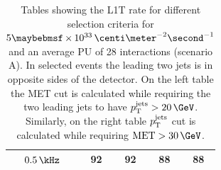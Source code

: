 \begin{table}[!htb]
\begin{minipage}{.5\linewidth}
\begin{tabular}{|c||c|c|c|c|}
  $0.5\,\kHz$  &     92 &  92 &  88 &  88 \\
  \hline
  \end{tabular}
\end{minipage} 
\caption{Tables showing the \gls{L1T} rate for different selection criteria for $5 \times 10^{33}\,\centi\meter^{-2}\second^{-1}$ and an average \gls{PU} of 28 interactions (scenario A). In selected events the leading two jets is in opposite sides of the detector. On the left table the \gls{MET} cut is calculated while requiring the two leading jets to have $\pt^{\text{jets}} > 20\,\GeV$. Similarly, on the right table $p_{\mathrm{T}}^{\text{jets}}$ cut is calculated while requiring $\text{MET}>30\,\GeV$.}
\label{TABLE:ParkedDataAnalysis_L1TParkedTriggerDevelopment_Rate5E33}
\end{table}

